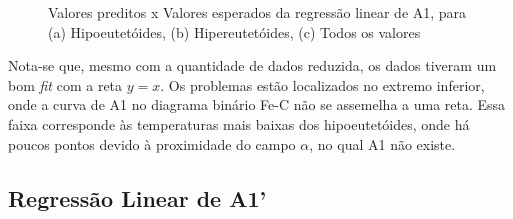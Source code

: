 \documentclass[brazil,tf,epusp]{usp}  %
\begin{document}
\begin{figure}[!h]
\caption{Valores preditos x Valores esperados da regressão linear de A1, para (a) Hipoeutetóides, (b) Hipereutetóides, (c) Todos os valores}
\label{fig:LR_A1}
\end{figure}

Nota-se que, mesmo com a quantidade de dados reduzida, os dados tiveram um bom \textit{fit} com a reta $y = x$. Os problemas estão localizados no extremo inferior, onde a curva de A1 no diagrama binário Fe-C não se assemelha a uma reta. Essa faixa corresponde às temperaturas mais baixas dos hipoeutetóides, onde há poucos pontos devido à proximidade do campo $\alpha$, no qual A1 não existe.

\subsection{Regressão Linear de A1'}
\end{document}
